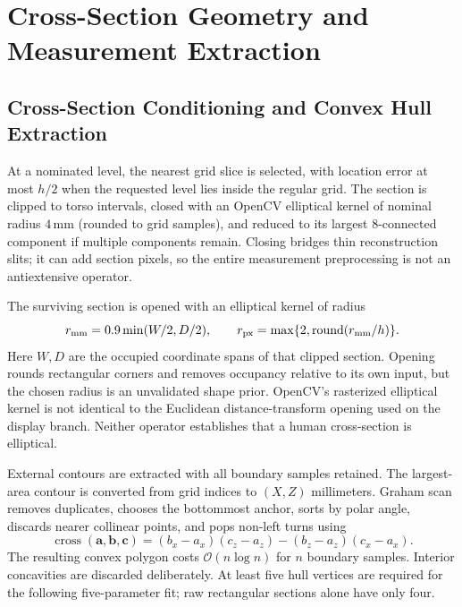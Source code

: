 \documentclass[11pt,a4paper]{article}
\numberwithin{equation}{section}
\begin{document}
\section{Cross-Section Geometry and Measurement Extraction}
\subsection{Cross-Section Conditioning and Convex Hull Extraction}
\label{subsec:shape_regularization}
\label{subsec:girth_extraction}
At a nominated level, the nearest grid slice is selected, with location error at most $h/2$ when the requested level lies inside the regular grid. The section is clipped to torso intervals, closed with an OpenCV elliptical kernel of nominal radius $4$\,mm (rounded to grid samples), and reduced to its largest 8-connected component if multiple components remain. Closing bridges thin reconstruction slits; it can add section pixels, so the entire measurement preprocessing is not an antiextensive operator.

The surviving section is opened with an elliptical kernel of radius
\begin{equation}
r_{\rm mm}=0.9\min(W/2,D/2),\qquad
r_{\rm px}=\max\{2,\operatorname{round}(r_{\rm mm}/h)\}.
\label{eq:disk_radius}
\end{equation}
Here $W,D$ are the occupied coordinate spans of that clipped section. Opening rounds rectangular corners and removes occupancy relative to its own input, but the chosen radius is an unvalidated shape prior. OpenCV's rasterized elliptical kernel is not identical to the Euclidean distance-transform opening used on the display branch. Neither operator establishes that a human cross-section is elliptical.

External contours are extracted with all boundary samples retained. The largest-area contour is converted from grid indices to $(X,Z)$ millimeters. Graham scan removes duplicates, chooses the bottommost anchor, sorts by polar angle, discards nearer collinear points, and pops non-left turns using
\begin{equation}
\operatorname{cross}(\mathbf a,\mathbf b,\mathbf c)
=(b_x-a_x)(c_z-a_z)-(b_z-a_z)(c_x-a_x).
\end{equation}
The resulting convex polygon costs $\mathcal O(n\log n)$ for $n$ boundary samples. Interior concavities are discarded deliberately. At least five hull vertices are required for the following five-parameter fit; raw rectangular sections alone have only four.
\end{document}
